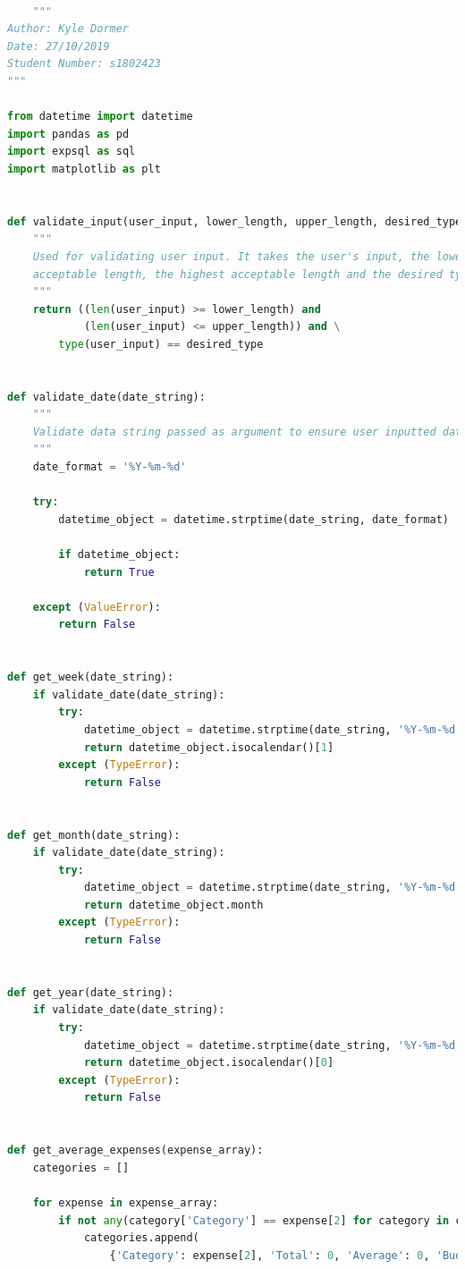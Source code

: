 \documentclass[11pt]{article}
\begin{document}
  \begin{lstlisting}[language=Python, caption=Source code for \textit{exptools.py}.]

    """
Author: Kyle Dormer
Date: 27/10/2019
Student Number: s1802423
"""

from datetime import datetime
import pandas as pd
import expsql as sql
import matplotlib as plt


def validate_input(user_input, lower_length, upper_length, desired_type):
    """
    Used for validating user input. It takes the user's input, the lowest
    acceptable length, the highest acceptable length and the desired type of input. It then returns a boolean according to whether the user's input matches the given length range and type.
    """
    return ((len(user_input) >= lower_length) and
            (len(user_input) <= upper_length)) and \
        type(user_input) == desired_type


def validate_date(date_string):
    """
    Validate data string passed as argument to ensure user inputted data conforms to correct format.
    """
    date_format = '%Y-%m-%d'

    try:
        datetime_object = datetime.strptime(date_string, date_format)

        if datetime_object:
            return True

    except (ValueError):
        return False


def get_week(date_string):
    if validate_date(date_string):
        try:
            datetime_object = datetime.strptime(date_string, '%Y-%m-%d')
            return datetime_object.isocalendar()[1]
        except (TypeError):
            return False


def get_month(date_string):
    if validate_date(date_string):
        try:
            datetime_object = datetime.strptime(date_string, '%Y-%m-%d')
            return datetime_object.month
        except (TypeError):
            return False


def get_year(date_string):
    if validate_date(date_string):
        try:
            datetime_object = datetime.strptime(date_string, '%Y-%m-%d')
            return datetime_object.isocalendar()[0]
        except (TypeError):
            return False


def get_average_expenses(expense_array):
    categories = []

    for expense in expense_array:
        if not any(category['Category'] == expense[2] for category in categories):
            categories.append(
                {'Category': expense[2], 'Total': 0, 'Average': 0, 'Budget': None})


\end{lstlisting}
\end{document}
